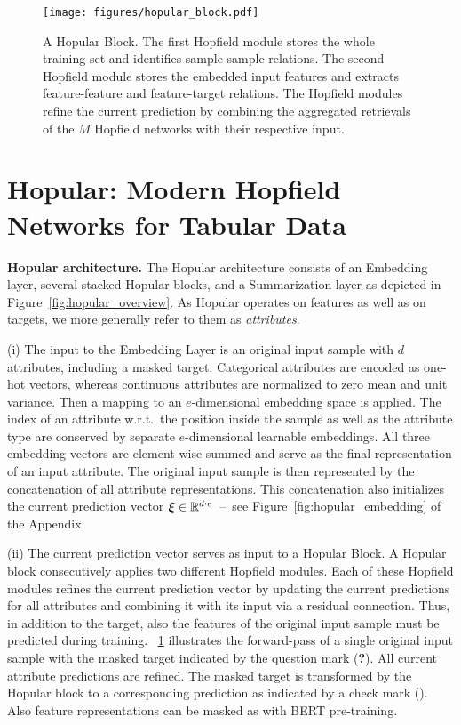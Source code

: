 \documentclass{article}
\theoremstyle{plain}
\theoremstyle{definition}
\theoremstyle{remark}
\newcommand\Bxi{\bm{\xi}}
\begin{document}
\begin{figure}[ht]
    \centering
    \texttt{[image: figures/hopular\_block.pdf]}
    \caption{A Hopular Block. The first Hopfield module stores the whole training set and identifies sample-sample relations. The second Hopfield module stores the embedded input features and extracts feature-feature and feature-target relations. The Hopfield
    modules refine the current prediction by combining the aggregated retrievals
    of the $M$ Hopfield networks with their respective input.
    \label{fig:architecture_overview}}
\end{figure}


\section{Hopular: Modern Hopfield Networks for Tabular Data} \label{sec:mhn_tabular}

{\bf Hopular architecture.}
The Hopular architecture consists of an Embedding layer, several stacked 
Hopular blocks, and a Summarization layer as depicted in Figure~\ref{fig:hopular_overview}. As Hopular operates on features as well as on targets, we more generally refer to them as \emph{attributes}.

(i) The input to the Embedding Layer is an original input sample with $d$ attributes, 
including a masked target.
Categorical attributes are encoded as one-hot vectors, 
whereas continuous attributes are normalized to zero mean 
and unit variance.
Then a mapping to an \mbox{$e$-dimensional} embedding space is applied. 
The index of an attribute w.r.t.\ the position inside 
the sample as well as the attribute type are conserved 
by separate $e$-dimensional learnable embeddings. 
All three embedding vectors are element-wise summed and
serve as the final representation of an input attribute. 
The original input sample is then represented by the concatenation of all
attribute representations. This concatenation also initializes the current 
prediction vector $\Bxi \in \dR^{d \cdot e}$~\---{}~see
Figure~\ref{fig:hopular_embedding} of the Appendix.

(ii) The current prediction vector serves as input to a Hopular Block.
A Hopular block consecutively applies two different Hopfield modules.
Each of these Hopfield modules refines the current prediction vector by updating
the current predictions for all attributes and combining it with its
input via a residual connection.
Thus, in addition to the target, also the features of the original input sample must be predicted during training.
\figurename~\ref{fig:architecture_overview} illustrates the forward-pass 
of a single original input sample with the masked target  
indicated by the question mark (\textbf{?}).
All current attribute predictions are refined.
The masked target is transformed by the Hopular block 
to a corresponding prediction as indicated by a check mark ().
Also feature representations can be masked as with
BERT pre-training.
\end{document}
